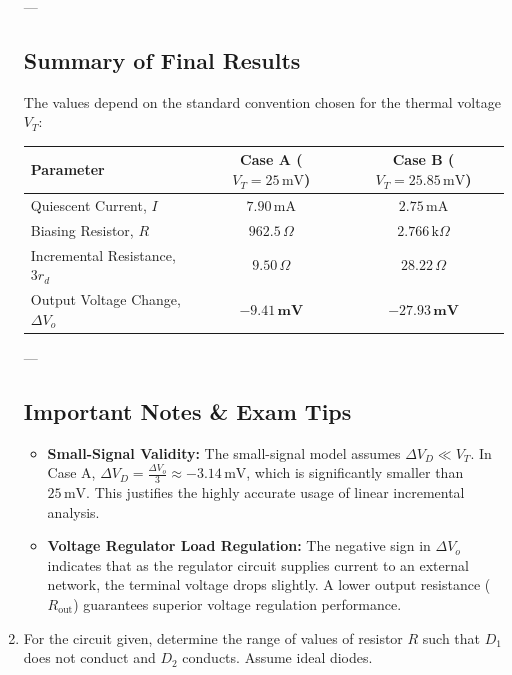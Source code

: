 \documentclass[12pt,a3paper]{article}
\begin{document}
\begin{enumerate}
\begin{tcolorbox}[enhanced,breakable,ansbox,colback=cA!4,colframe=cA,boxrule=0.8pt,arc=5pt,title={\textbf{Answer}},fonttitle=\bfseries\color{white},colbacktitle=cA]
---

\subsection*{Summary of Final Results}

The values depend on the standard convention chosen for the thermal voltage $V_T$:

\begin{center}
\begin{tabular}{l c c}
\toprule
\textbf{Parameter} & \textbf{Case A} ($V_T = 25\,\text{mV}$) & \textbf{Case B} ($V_T = 25.85\,\text{mV}$) \\
\midrule
Quiescent Current, $I$ & $7.90\,\text{mA}$ & $2.75\,\text{mA}$ \\
Biasing Resistor, $R$ & $962.5\,\Omega$ & $2.766\,\text{k}\Omega$ \\
Incremental Resistance, $3r_d$ & $9.50\,\Omega$ & $28.22\,\Omega$ \\
Output Voltage Change, $\Delta V_o$ & $\mathbf{-9.41\,\text{mV}}$ & $\mathbf{-27.93\,\text{mV}}$ \\
\bottomrule
\end{tabular}
\end{center}

---

\subsection*{Important Notes \& Exam Tips}
\begin{itemize}
    \item \textbf{Small-Signal Validity:} The small-signal model assumes $\Delta V_D \ll V_T$. In Case A, $\Delta V_D = \frac{\Delta V_o}{3} \approx -3.14\,\text{mV}$, which is significantly smaller than $25\,\text{mV}$. This justifies the highly accurate usage of linear incremental analysis.
    \item \textbf{Voltage Regulator Load Regulation:} The negative sign in $\Delta V_o$ indicates that as the regulator circuit supplies current to an external network, the terminal voltage drops slightly. A lower output resistance ($R_{\text{out}}$) guarantees superior voltage regulation performance.
\end{itemize}

\end{tcolorbox}

\item For the circuit given, determine the range of values of resistor $R$ such that $D_1$ does not conduct and $D_2$ conducts. Assume ideal diodes.
\begin{center}
        \begin{circuitikz}
        

\end{circuitikz}
\end{center}
\end{enumerate}
\end{document}

